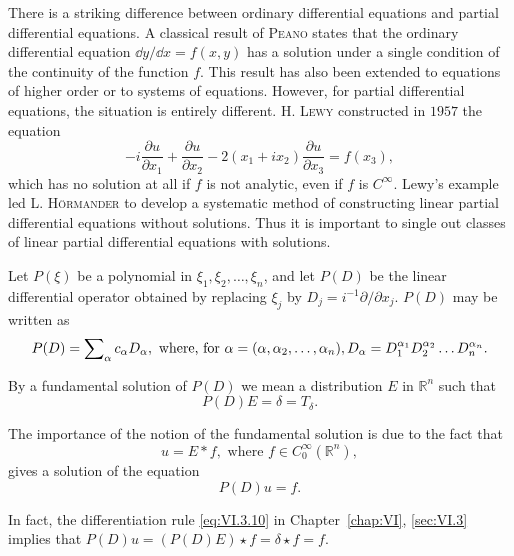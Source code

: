 There is a striking difference between ordinary differential equations and partial differential equations. A classical result of \textsc{Peano} states that the ordinary differential equation $\dd y/\dd x = f(x, y)$ has a solution under a single condition of the continuity of the function $f$. This result has also been extended to equations of higher order or to systems of equations. However, for partial differential equations, the situation is entirely different. H. \textsc{Lewy} \cite{leray176} constructed in $1957$ the equation 
\[
- i \frac {\partial u}{\partial x _{1}} + \frac {\partial u}{\partial x _{2}} - 2 (x _{1} + i x _{2}) \frac {\partial u}{\partial x _{3}} = f (x _{3}),
\]
which has no solution at all if $f$ is not analytic, even if $f$ is $C^{\infty}$. Lewy's example led L. \textsc{Hörmander} \cite{hormander115} to develop a systematic method of constructing linear partial differential equations without solutions. Thus it is important to single out classes of linear partial differential equations with solutions. 

Let $P(\xi)$ be a polynomial in $\xi_{1}, \xi_{2}, \ldots, \xi_{n}$, and let $P(D)$ be the linear differential operator obtained by replacing $\xi_{j}$ by $D_{j} = i^{-1}\partial/\partial x_{j}$. $P(D)$ may be written as 
\begin{equation}P (D) = \sum\limits_{\alpha} c _{\alpha} D _{\alpha}, \text{ where, for } \alpha = (\alpha , \alpha_{2}, \dots , \alpha_{n}), D _{\alpha} = D _{1} ^ {\alpha_{1}} D _{2} ^ {\alpha_{2}} \dots D _{n} ^ {\alpha_{n}}. \notag\end{equation}

\begin{definition}\label{def:VI.10.Definition.1} By a fundamental solution of $P(D)$ we mean a distribution $E$ in $\mathbb{R}^{n}$ such that 
\[
P (D) E = \delta = T _{\delta}.
\]
\end{definition}

The importance of the notion of the fundamental solution is due to the fact that 
\[
u = E * f, \text{ where } f \in C _{0} ^{\infty} (\mathbb{R}^{n}),
\]
gives a solution of the equation 
\[
P (D) u = f.
\]

In fact, the differentiation rule \eqref{eq:VI.3.10} in Chapter~\ref{chap:VI}, \ref{sec:VI.3} implies that $P(D)u = (P(D)E)\star f = \delta \star f = f$. 

